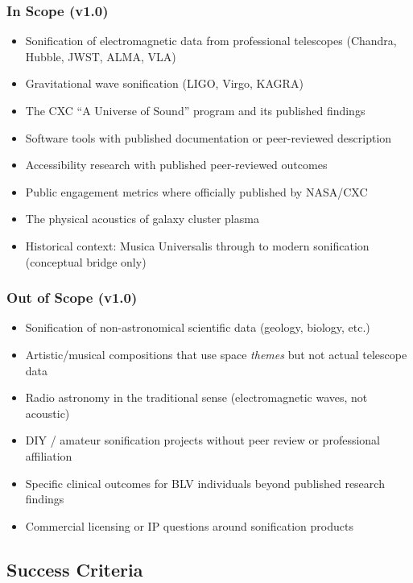 \documentclass[11pt,letterpaper]{article}
\begin{document}
\subsubsection{In Scope (v1.0)}
\begin{itemize}
  \item Sonification of electromagnetic data from professional telescopes (Chandra, Hubble, JWST, ALMA, VLA)
  \item Gravitational wave sonification (LIGO, Virgo, KAGRA)
  \item The CXC ``A Universe of Sound'' program and its published findings
  \item Software tools with published documentation or peer-reviewed description
  \item Accessibility research with published peer-reviewed outcomes
  \item Public engagement metrics where officially published by NASA/CXC
  \item The physical acoustics of galaxy cluster plasma
  \item Historical context: Musica Universalis through to modern sonification (conceptual bridge only)
\end{itemize}

\subsubsection{Out of Scope (v1.0)}
\begin{itemize}
  \item Sonification of non-astronomical scientific data (geology, biology, etc.)
  \item Artistic/musical compositions that use space \emph{themes} but not actual telescope data
  \item Radio astronomy in the traditional sense (electromagnetic waves, not acoustic)
  \item DIY / amateur sonification projects without peer review or professional affiliation
  \item Specific clinical outcomes for BLV individuals beyond published research findings
  \item Commercial licensing or IP questions around sonification products
\end{itemize}

\subsection{Success Criteria}
\end{document}
